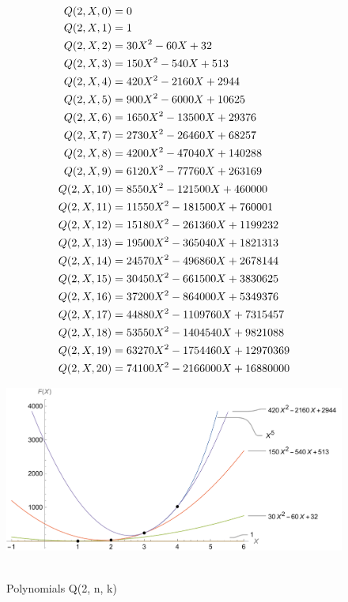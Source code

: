 ﻿\begin{align*}
    {Q}(2,X,0) &= 0 \\
    {Q}(2,X,1) &= 1 \\
    {Q}(2,X,2) &= 30X^2 - 60X + 32 \\
    {Q}(2,X,3) &= 150X^2 - 540X + 513 \\
    {Q}(2,X,4) &= 420X^2 - 2160X + 2944 \\
    {Q}(2,X,5) &= 900X^2 - 6000X + 10625 \\
    {Q}(2,X,6) &= 1650X^2 - 13500X + 29376 \\
    {Q}(2,X,7) &= 2730X^2 - 26460X + 68257 \\
    {Q}(2,X,8) &= 4200X^2 - 47040X + 140288 \\
    {Q}(2,X,9) &= 6120X^2 - 77760X + 263169 \\
    {Q}(2,X,10) &= 8550X^2 - 121500X + 460000 \\
    {Q}(2,X,11) &= 11550X^2 - 181500X + 760001 \\
    {Q}(2,X,12) &= 15180X^2 - 261360X + 1199232 \\
    {Q}(2,X,13) &= 19500X^2 - 365040X + 1821313 \\
    {Q}(2,X,14) &= 24570X^2 - 496860X + 2678144 \\
    {Q}(2,X,15) &= 30450X^2 - 661500X + 3830625 \\
    {Q}(2,X,16) &= 37200X^2 - 864000X + 5349376 \\
    {Q}(2,X,17) &= 44880X^2 - 1109760X + 7315457 \\
    {Q}(2,X,18) &= 53550X^2 - 1404540X + 9821088 \\
    {Q}(2,X,19) &= 63270X^2 - 1754460X + 12970369 \\
    {Q}(2,X,20) &= 74100X^2 - 2166000X + 16880000
\end{align*}
\begin{figure}[H]
    \centering
    \includegraphics[width=1\textwidth]{sections/images/04_fifth_power_with_q_1_n_k}
    ~\caption{Polynomials Q(2, n, k)}\label{fig:figure4}
\end{figure}
